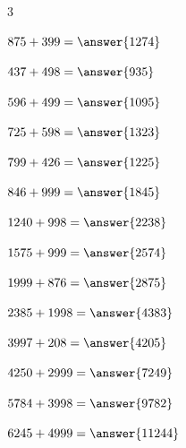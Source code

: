 \documentclass{ximera}
\begin{document}
\begin{oefening}{\oefB\ESS}
\begin{multicols}{3}
    \begin{question} \(875+399=\answer{1274}\) \end{question}
    
    \begin{question} \(437+498=\answer{935}\) \end{question}
    
    \begin{question} \(596+499=\answer{1095}\) \end{question}
    
    \begin{question} \(725+598=\answer{1323}\) \end{question}
    
    \begin{question} \(799+426=\answer{1225}\) \end{question}
    
    \begin{question} \(846+999=\answer{1845}\) \end{question}
    
    \begin{question} \(1240+998=\answer{2238}\) \end{question}
    
    \begin{question} \(1575+999=\answer{2574}\) \end{question}
    
    \begin{question} \(1999+876=\answer{2875}\) \end{question}
    
    \begin{question} \(2385+1998=\answer{4383}\) \end{question}
    
    \begin{question} \(3997+208=\answer{4205}\) \end{question}
    
    \begin{question} \(4250+2999=\answer{7249}\) \end{question}
    
    \begin{question} \(5784+3998=\answer{9782}\) \end{question}
    
    \begin{question} \(6245+4999=\answer{11244}\) \end{question}
    

\end{multicols}
\end{oefening}
\end{document}
